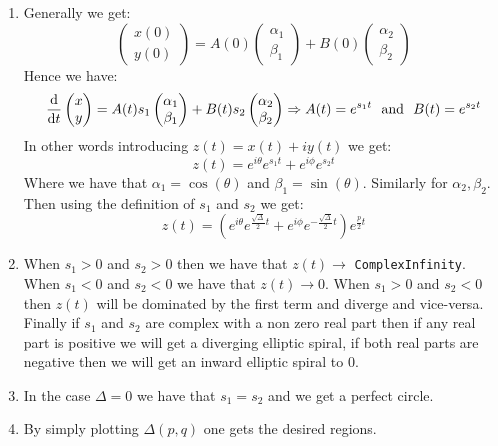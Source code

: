 \documentclass[10pt,a4paper]{book}
\begin{document}
\begin{enumerate}
\item Generally we get:
\[
\begin{pmatrix}
x(0)\\
y(0)
\end{pmatrix} = A(0) \begin{pmatrix} \alpha_1 \\ \beta_1 \end{pmatrix} + B(0) \begin{pmatrix}
\alpha_2 \\ \beta_2
\end{pmatrix}
\]
Hence we have:
\[
\dv{}{t} \begin{pmatrix}
x \\ y
\end{pmatrix}
 = A(t) s_1 \begin{pmatrix}
 \alpha_1 \\ \beta_1
 \end{pmatrix} + B(t) s_2 \begin{pmatrix}
 \alpha_2 \\ \beta_2
 \end{pmatrix} \Rightarrow A(t) = e^{s_1 t} \mbox{~~and~~} B(t) = e^{s_2 t}
\]
In other words introducing $z(t) = x(t) + i y(t)$ we get:
\[
z(t) = e^{i\theta} e^{s_1 t} + e^{i\phi} e^{s_2 t}
\]
Where we have that $\alpha_1 = \cos(\theta)$ and $\beta_1 = \sin(\theta)$. Similarly for $\alpha_2, \beta_2$. Then using the definition of $s_1$ and $s_2$ we get:
\[
z(t) = (e^{i\theta} e^{\frac{\sqrt{\Delta}}{2} t} + e^{i\phi} e^{-\frac{\sqrt{\Delta}}{2} t})e^{\frac{p}{2}t}
\]

\item When $s_1 > 0$ and $s_2 > 0$ then we have that $z(t) \to $ \texttt{ComplexInfinity}. When $s_1 < 0$ and $s_2 < 0$ we have that $z(t) \to 0$. When $s_1 > 0$ and $s_2 < 0$ then $z(t)$ will be dominated by the first term and diverge and vice-versa. Finally if $s_1$ and $s_2$ are complex with a non zero real part then if any real part is positive we will get a diverging elliptic spiral, if both real parts are negative then we will get an inward elliptic spiral to 0.

\item In the case $\Delta = 0$ we have that $s_1 = s_2$ and we get a perfect circle. 

\item By simply plotting $\Delta(p, q)$ one gets the desired regions.

\end{enumerate}
\end{document}
